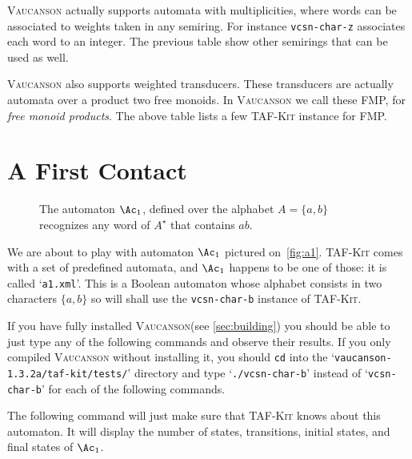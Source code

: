 \documentclass[a4paper]{report}
\def\VcsnVersion{1.3.2a}
\newcommand\file[1]{`\texttt{#1}'}
\newcommand\command[1]{\texttt{#1}}
\newcommand\samp[1]{`\texttt{#1}'}
\newcommand{\tafkit}{\textsc{TAF-Kit}\xspace}
\newcommand{\Vauc}{\textsc{Vaucanson}\xspace}
\begin{document}
\Vauc actually supports automata with multiplicities, where words can
be associated to weights taken in any semiring.  For instance
\command{vcsn-char-z} associates each word to an integer.  The previous
table show other semirings that can be used as well.

\Vauc also supports weighted transducers.  These transducers are
actually automata over a product two free monoids.  In \Vauc we call
these FMP, for \emph{free monoid products}.  The above table lists a
few \tafkit instance for FMP.

\section{A First Contact}\label{sec:firstcontact}

\begin{figure}[tbp] \centering
  \caption{The automaton $\Ac_1$, defined over the alphabet
    $A=\{a,b\}$ recognizes any word of $A^\star$ that
    contains $ab$. \label{fig:a1}}
\end{figure}

We are about to play with automaton $\Ac_1$ pictured
on~\autoref{fig:a1}.  \tafkit comes with a set of predefined automata,
and $\Ac_1$ happens to be one of those: it is called \file{a1.xml}.
This is a Boolean automaton whose alphabet consists in two characters
$\{a,b\}$ so will shall use the \command{vcsn-char-b} instance of
\tafkit.

If you have fully installed \Vauc (see \autoref{sec:building}) you
should be able to just type any of the following commands and observe
their results.  If you only compiled \Vauc without installing it, you
should \command{cd} into the
\file{vaucanson-\VcsnVersion/taf-kit/tests/} directory and type
\samp{./vcsn-char-b} instead of \samp{vcsn-char-b} for each of the
following commands.

The following command will just make sure that \tafkit knows about
this automaton.  It will display the number of states, transitions,
initial states, and final states of $\Ac_1$.
\end{document}
